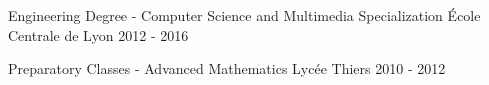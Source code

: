 

\begin{cventries}

	\cventry
	{Engineering Degree - Computer Science and Multimedia Specialization}
	{}
	{École Centrale de Lyon}
	{}
	{2012 - 2016}
	{}
	{}

	\cventry
	{Preparatory Classes - Advanced Mathematics}
	{}
	{Lycée Thiers}
	{}
	{2010 - 2012}
	{}
	{}
\end{cventries}
